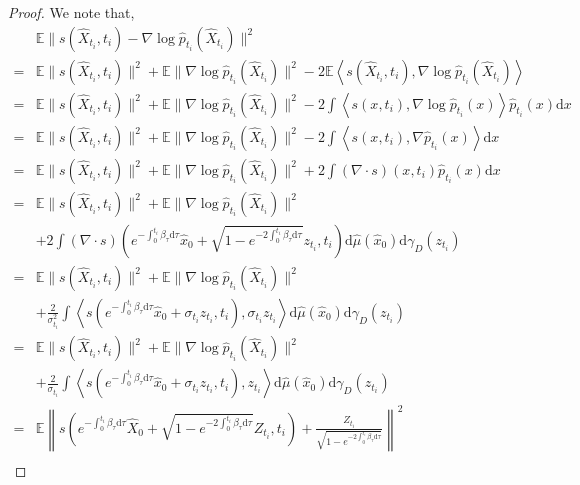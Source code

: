 \documentclass[12pts]{article}
\newcommand{\diff}{\mathrm{d}}
\newcommand{\hX}{ \widehat{X}}
\newcommand{\hmu}{\hat{\mu}}
\newcommand{\E}{\mathbb{E}}
\newcommand{\hx}{\hat{x}}
\newcommand{\hp}{\hat{p}}
\begin{document}
\begin{proof}
We note that,
\begingroup
\allowdisplaybreaks
\begin{align}
   & \E  \| s(\hX_{t_i}, t_i) - \nabla \log \hp_{t_i}(\hX_{t_i})\|^2 \nonumber\\
    = & \E  \| s(\hX_{t_i}, t_i)\|^2  + \E\| \nabla \log \hp_{t_i}(\hX_{t_i})\|^2 - 2 \E \left\langle s(\hX_{t_i}, t_i), \nabla \log \hp_{t_i}(\hX_{t_i}) \right\rangle \nonumber \\
    = & \E  \| s(\hX_{t_i}, t_i)\|^2  + \E\| \nabla \log \hp_{t_i}(\hX_{t_i})\|^2 - 2 \int \left\langle s(x, t_i), \nabla \log \hp_{t_i}(x) \right\rangle \hat{p}_{t_i}(x) \diff x \nonumber \\
     = & \E  \| s(\hX_{t_i}, t_i)\|^2  + \E\| \nabla \log \hp_{t_i}(\hX_{t_i})\|^2 - 2 \int \left\langle s(x, t_i), \nabla  \hp_{t_i}(x) \right\rangle  \diff x \nonumber\\
     = & \E  \| s(\hX_{t_i}, t_i)\|^2  + \E\| \nabla \log \hp_{t_i}(\hX_{t_i})\|^2 + 2 \int  (\nabla \cdot s)(x, t_i)   \hp_{t_i}(x)   \diff x \label{gip}\\
     = & \E  \| s(\hX_{t_i}, t_i)\|^2  + \E\| \nabla \log \hp_{t_i}(\hX_{t_i})\|^2 \nonumber\\
     & + 2 \int  (\nabla \cdot s)\left(e^{-\int_0^{t_i} \beta_\tau \diff  \tau } \hx_0 + \sqrt{1-e^{- 2\int_0^{t_i} \beta_\tau \diff  \tau}} z_{t_i} , t_i\right)   \diff \hmu(\hx_0)    \diff \gamma_D(z_{t_i}) \nonumber\\
     = & \E  \| s(\hX_{t_i}, t_i)\|^2  + \E\| \nabla \log \hp_{t_i}(\hX_{t_i})\|^2 \nonumber\\
     & + \frac{2}{\sigma_{t_i}^2} \int   \left\langle s\left(e^{-\int_0^{t_i} \beta_\tau \diff  \tau } \hx_0 + \sigma_{t_i} z_{t_i} , t_i\right), \sigma_{t_i} z_{t_i} \right\rangle  \diff \hmu(\hx_0)    \diff \gamma_D(z_{t_i}) \nonumber\\
     = & \E  \| s(\hX_{t_i}, t_i)\|^2  + \E\| \nabla \log \hp_{t_i}(\hX_{t_i})\|^2 \nonumber\\
     & + \frac{2}{\sigma_{t_i}} \int   \left\langle s\left(e^{-\int_0^{t_i} \beta_\tau \diff  \tau } \hx_0 + \sigma_{t_i} z_{t_i} , t_i\right), z_{t_i} \right\rangle   \diff \hmu(\hx_0)    \diff \gamma_D(z_{t_i}) \nonumber\\
     = & \E \left\| s\left(e^{-\int_0^{t_i} \beta_\tau \diff  \tau } \hX_0 + \sqrt{1-e^{- 2\int_0^{t_i} \beta_\tau \diff  \tau}} Z_{t_i} , t_i\right) + \frac{Z_{t_i}}{\sqrt{1-e^{- 2\int_0^{t_i} \beta_\tau \diff  \tau}}}  \right\|^2 \nonumber \\

\end{align}
\end{proof}
\end{document}
